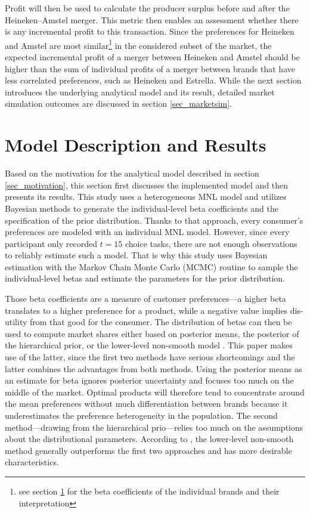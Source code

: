 \documentclass[12pt,a4paper]{article}
\begin{document}
Profit will then be used to calculate the producer surplus before and after the Heineken--Amstel merger.
This metric then enables an assessment whether there is any incremental profit to this transaction.
Since the preferences for Heineken and Amstel are most similar\footnote{see section \ref{sec_model} for the beta coefficients of the individual brands and their interpretation} in the considered subset of the market, the expected incremental profit of a merger between Heineken and Amstel should be higher than the sum of individual profits of a merger between brands that have less correlated preferences, such as Heineken and Estrella.
While the next section introduces the underlying analytical model and its result, detailed market simulation outcomes are discussed in section \ref{sec_marketsim}.


\section{Model Description and Results} \label{sec_model}

Based on the motivation for the analytical model described in section \ref{sec_motivation}, this section first discusses the implemented model and then presents its results.
This study uses a heterogeneous MNL model and utilizes Bayesian methods to generate the individual-level beta coefficients and the specification of the prior distribution.
Thanks to that approach, every consumer's preferences are modeled with an individual MNL model.
However, since every participant only recorded $t=15$ choice tasks, there are not enough observations to reliably estimate such a model.
That is why this study uses Bayesian estimation with the Markov Chain Monte Carlo (MCMC) routine to sample the individual-level betas and estimate the parameters for the prior distribution.

Those beta coefficients are a measure of customer preferences---a higher beta translates to a higher preference for a product, while a negative value implies dis-utility from that good for the consumer.
The distribution of betas can then be used to compute market shares either based on posterior means, the posterior of the hierarchical prior, or the lower-level non-smooth model \citep{pachaliHowGeneralizeHierarchical2017}.
This paper makes use of the latter, since the first two methods have serious shortcomings and the latter combines the advantages from both methods.
Using the posterior means as an estimate for beta ignores posterior uncertainty and focuses too much on the middle of the market.
Optimal products will therefore tend to concentrate around the mean preferences without much differentiation between brands because it underestimates the preference heterogeneity in the population.
The second method---drawing from the hierarchical prio---relies too much on the assumptions about the distributional parameters. 
According to \cite{pachaliHowGeneralizeHierarchical2017}, the lower-level non-smooth method generally outperforms the first two approaches and has more desirable characteristics.
\end{document}

